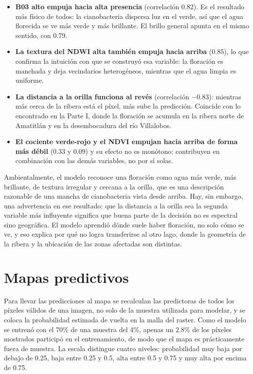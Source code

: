 \documentclass[10pt,a4paper]{article}
\begin{document}
\begin{itemize}
  \item \textbf{B03 alto empuja hacia alta presencia} (correlación 0.82). Es el resultado más físico de todos: la
  cianobacteria dispersa luz en el verde, así que el agua florecida se ve más verde y más brillante. El brillo
  general apunta en el mismo sentido, con 0.79.
  \item \textbf{La textura del NDWI alta también empuja hacia arriba} (0.85), lo que confirma la intuición con que
  se construyó esa variable: la floración es manchada y deja vecindarios heterogéneos, mientras que el agua limpia
  es uniforme.
  \item \textbf{La distancia a la orilla funciona al revés} (correlación $-0.83$): mientras más cerca de la ribera
  está el píxel, más sube la predicción. Coincide con lo encontrado en la Parte I, donde la floración se acumula en
  la ribera norte de Amatitlán y en la desembocadura del río Villalobos.
  \item \textbf{El cociente verde-rojo y el NDVI empujan hacia arriba de forma más débil} (0.33 y 0.09) y su efecto
  no es monótono: contribuyen en combinación con las demás variables, no por sí solas.
\end{itemize}

Ambientalmente, el modelo reconoce una floración como agua más verde, más brillante, de textura irregular y cercana
a la orilla, que es una descripción razonable de una mancha de cianobacteria vista desde arriba. Hay, sin embargo,
una advertencia en ese resultado: que la distancia a la orilla sea la segunda variable más influyente significa que
buena parte de la decisión no es espectral sino geográfica. El modelo aprendió dónde suele haber floración, no solo
cómo se ve, y eso explica por qué no logra transferirse al otro lago, donde la geometría de la ribera y la
ubicación de las zonas afectadas son distintas.

\section{Mapas predictivos}

Para llevar las predicciones al mapa se recalculan las predictoras de todos los píxeles válidos de una imagen, no
solo de la muestra utilizada para modelar, y se coloca la probabilidad estimada de vuelta en la malla del raster.
Como el modelo se entrenó con el 70\% de una muestra del 4\%, apenas un 2.8\% de los píxeles mostrados participó
en el entrenamiento, de modo que el mapa es prácticamente fuera de muestra. La escala distingue cuatro niveles:
probabilidad muy baja por debajo de 0.25, baja entre 0.25 y 0.5, alta entre 0.5 y 0.75 y muy alta por encima
de 0.75.
\end{document}
